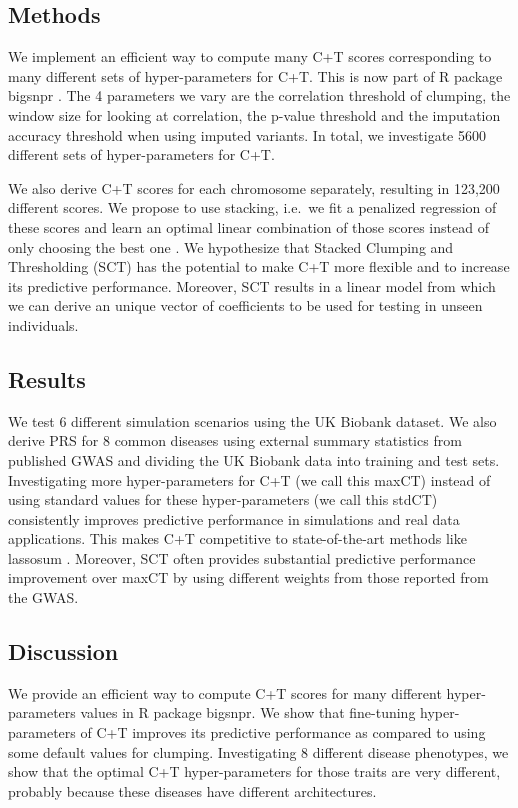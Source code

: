 \subsection{Methods}

We implement an efficient way to compute many C+T scores corresponding to many different sets of hyper-parameters for C+T. This is now part of R package bigsnpr \cite[]{prive2018efficient}. 
The 4 parameters we vary are the correlation threshold of clumping, the window size for looking at correlation, the p-value threshold and the imputation accuracy threshold when using imputed variants.
In total, we investigate 5600 different sets of hyper-parameters for C+T.

We also derive C+T scores for each chromosome separately, resulting in 123,200 different scores.
We propose to use stacking, i.e.\ we fit a penalized regression of these scores and learn an optimal linear combination of those scores instead of only choosing the best one \cite[]{breiman1996stacked}.
We hypothesize that Stacked Clumping and Thresholding (SCT) has the potential to make C+T more flexible and to increase its predictive performance.
Moreover, SCT results in a linear model from which we can derive an unique vector of coefficients to be used for testing in unseen individuals.

\subsection{Results}

We test 6 different simulation scenarios using the UK Biobank dataset. We also derive PRS for 8 common diseases using external summary statistics from published GWAS and dividing the UK Biobank data into training and test sets.
Investigating more hyper-parameters for C+T (we call this maxCT) instead of using standard values for these hyper-parameters (we call this stdCT) consistently improves predictive performance in simulations and real data applications.
This makes C+T competitive to state-of-the-art methods like lassosum \cite[]{mak2017polygenic}.
Moreover, SCT often provides substantial predictive performance improvement over maxCT by using different weights from those reported from the GWAS.

\subsection{Discussion}

We provide an efficient way to compute C+T scores for many different hyper-parameters values in R package bigsnpr. We show that fine-tuning hyper-parameters of C+T improves its predictive performance as compared to using some default values for clumping. Investigating 8 different disease phenotypes, we show that the optimal C+T hyper-parameters for those traits are very different, probably because these diseases have different architectures.


